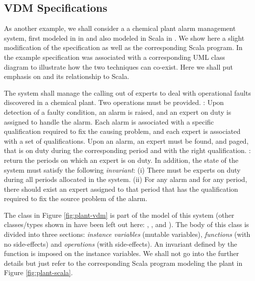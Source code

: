 \subsection{VDM Specifications}
\label{sec:vdm-in-scala}

As another example, we shall consider a a chemical plant alarm 
management system, first modeled in \vdmpp{} in 
\cite{vdmplusplus05} and also modeled in Scala in 
\cite{?}. We show here a slight modification of 
the \vdmpp{} specification as well as the 
corresponding Scala program. In \cite{vdmplusplus05}
the example specification was associated with 
a corresponding UML class diagram to illustrate how the two
techniques can co-exist. Here we shall put emphasis on
\vdmpp{} and its relationship to Scala.

The system shall manage the calling out of experts to deal with 
operational faults discovered in a 
chemical plant. 
Two operations must be provided.
: Upon detection of a faulty condition, an 
alarm is raised, and an expert on duty is assigned to
handle the alarm. Each alarm is associated with a specific 
qualification required to fix the causing
problem, and each expert is associated with a set of 
qualifications. Upon an alarm, an expert must be found, and paged, 
that is on duty during the corresponding period and with the right 
qualification.    
: return the periods on which an expert is on 
duty.      
In addition, the state of the system must satisfy the following
{\em invariant}:
(i) There must be experts on duty during all periods 
allocated in the system. 
(ii) For any alarm and for any period, there should exist an 
expert assigned to that period that has the qualification required
to fix the source problem of the alarm.

The \vdmpp{} class  in Figure \ref{fig:plant-vdm} 
is part of the model of this system (other classes/types shown in
\cite{vdmplusplus05} have been left out here: 
, , and ).
The body of this class is divided into three sections: {\em 
instance variables} (mutable variables), {\em functions} (with no 
side-effects) and {\em operations} (with side-effects). An 
invariant defined by the function  is imposed on 
the instance variables. We shall not go into the further details
but just refer to the corresponding Scala program modeling the 
plant in Figure \ref{fig:plant-scala}.

